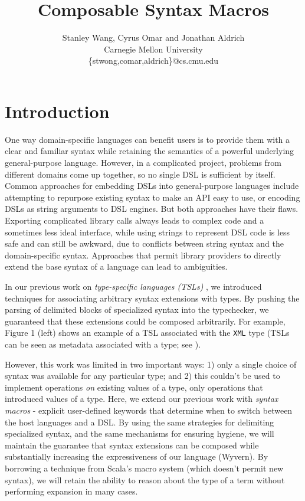 \documentclass[letterpaper, notitlepage]{article}
\begin{document}
\title{Composable Syntax Macros}
\author{Stanley Wang, Cyrus Omar and Jonathan Aldrich\\
Carnegie Mellon University\\
\{stwong,comar,aldrich\}@cs.cmu.edu}
\date{}
\maketitle

\section{Introduction}
One way domain-specific languages can benefit users is to provide them with a clear and familiar syntax while retaining the semantics of a powerful underlying general-purpose language. However, in a complicated project, problems from different domains come up together, so no single DSL is sufficient by itself. Common approaches for embedding DSLs into general-purpose languages include attempting to repurpose existing syntax to make an API easy to use, or encoding DSLs as string arguments to DSL engines. But both approaches have their flaws. Exporting complicated library calls always leads to complex code and a sometimes less ideal interface, while using strings to represent DSL code is less safe and can still be awkward, due to conflicts between string syntax and the domain-specific syntax. Approaches that permit library providers to directly extend the base syntax of a language can lead to ambiguities.

In our previous work on \emph{type-specific languages (TSLs)} \cite{TSLs}, we introduced techniques for associating arbitrary syntax extensions with types. By pushing the parsing of delimited blocks of specialized syntax into the typechecker, we guaranteed that these extensions could be composed arbitrarily. For example, Figure 1 (left) shows an example of a TSL associated with the \verb|XML| type (TSLs can be seen as metadata associated with a type; see \cite{TSLs}).

However, this work was limited in two important ways: 1) only a single choice of syntax was available for any particular type; and 2) this couldn't be used to implement operations \emph{on} existing values of a type, only operations that introduced values of a type. Here, we extend our previous work with \emph{syntax macros} - explicit user-defined keywords that determine when to switch between the host languages and a DSL. By using the same strategies for delimiting specialized syntax, and the same mechanisms for ensuring hygiene, we will maintain the guarantee that syntax extensions can be composed while substantially increasing the expressiveness of our language (Wyvern). By borrowing a technique from Scala's macro system (which doesn't permit new syntax), we will retain the ability to reason about the type of a term without performing expansion in many cases.
\end{document}
